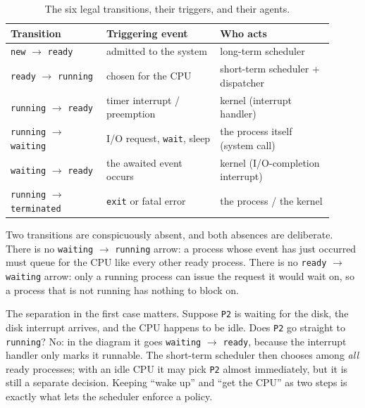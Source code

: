 \documentclass[11pt]{article}
\begin{document}
\begin{table}[h]
\centering
\small
\renewcommand{\arraystretch}{1.25}
\begin{tabular}{@{}>{\raggedright\arraybackslash}p{0.27\linewidth}>{\raggedright\arraybackslash}p{0.32\linewidth}>{\raggedright\arraybackslash}p{0.32\linewidth}@{}}
\toprule
\textbf{Transition} & \textbf{Triggering event} & \textbf{Who acts} \\
\midrule
\texttt{new} $\to$ \texttt{ready} & admitted to the system & long-term scheduler \\
\texttt{ready} $\to$ \texttt{running} & chosen for the CPU & short-term scheduler + dispatcher \\
\texttt{running} $\to$ \texttt{ready} & timer interrupt / preemption & kernel (interrupt handler) \\
\texttt{running} $\to$ \texttt{waiting} & I/O request, \texttt{wait}, sleep & the process itself (system call) \\
\texttt{waiting} $\to$ \texttt{ready} & the awaited event occurs & kernel (I/O-completion interrupt) \\
\texttt{running} $\to$ \texttt{terminated} & \texttt{exit} or fatal error & the process / the kernel \\
\bottomrule
\end{tabular}
\caption{The six legal transitions, their triggers, and their agents.}
\label{tab:transitions}
\end{table}

Two transitions are conspicuously absent, and both absences are deliberate.
There is no \texttt{waiting} $\to$ \texttt{running} arrow: a process whose
event has just occurred must queue for the CPU like every other ready process.
There is no \texttt{ready} $\to$ \texttt{waiting} arrow: only a running process
can issue the request it would wait on, so a process that is not running has
nothing to block on.

The separation in the first case matters. Suppose \texttt{P2} is waiting for
the disk, the disk interrupt arrives, and the CPU happens to be idle. Does
\texttt{P2} go straight to \texttt{running}? No: in the diagram it goes
\texttt{waiting} $\to$ \texttt{ready}, because the interrupt handler only marks
it runnable. The short-term scheduler then chooses among \emph{all} ready
processes; with an idle CPU it may pick \texttt{P2} almost immediately, but it
is still a separate decision. Keeping ``wake up'' and ``get the CPU'' as two
steps is exactly what lets the scheduler enforce a policy.
\end{document}
